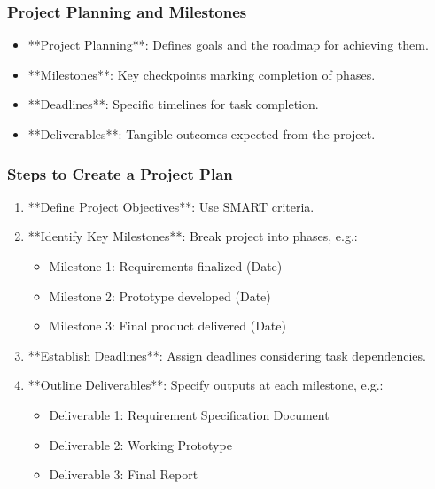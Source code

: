 \documentclass[aspectratio=169]{beamer}
\begin{document}
\begin{frame}[fragile]
    \frametitle{Project Planning and Milestones}
    \begin{itemize}
        \item **Project Planning**: Defines goals and the roadmap for achieving them.
        \item **Milestones**: Key checkpoints marking completion of phases.
        \item **Deadlines**: Specific timelines for task completion.
        \item **Deliverables**: Tangible outcomes expected from the project.
    \end{itemize}
\end{frame}

\begin{frame}[fragile]
    \frametitle{Steps to Create a Project Plan}
    \begin{enumerate}
        \item **Define Project Objectives**: Use SMART criteria.
        \item **Identify Key Milestones**: Break project into phases, e.g.:
        \begin{itemize}
            \item Milestone 1: Requirements finalized (Date)
            \item Milestone 2: Prototype developed (Date)
            \item Milestone 3: Final product delivered (Date)
        \end{itemize}
        \item **Establish Deadlines**: Assign deadlines considering task dependencies.
        \item **Outline Deliverables**: Specify outputs at each milestone, e.g.:
        \begin{itemize}
            \item Deliverable 1: Requirement Specification Document
            \item Deliverable 2: Working Prototype
            \item Deliverable 3: Final Report
        \end{itemize}
    \end{enumerate}
\end{frame}
\end{document}
